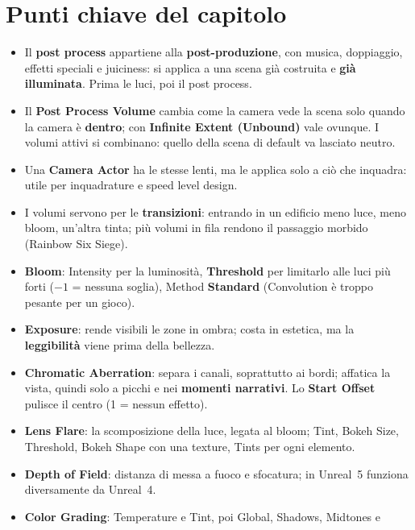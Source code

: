 \section*{Punti chiave del capitolo}

\begin{itemize}
  \item Il \textbf{post process} appartiene alla \textbf{post-produzione}, con musica,
        doppiaggio, effetti speciali e juiciness: si applica a una scena già costruita e
        \textbf{già illuminata}. Prima le luci, poi il post process.
  \item Il \textbf{Post Process Volume} cambia come la camera vede la scena solo quando la
        camera è \textbf{dentro}; con \textbf{Infinite Extent (Unbound)} vale ovunque. I
        volumi attivi si combinano: quello della scena di default va lasciato neutro.
  \item Una \textbf{Camera Actor} ha le stesse lenti, ma le applica solo a ciò che inquadra:
        utile per inquadrature e speed level design.
  \item I volumi servono per le \textbf{transizioni}: entrando in un edificio meno luce, meno
        bloom, un'altra tinta; più volumi in fila rendono il passaggio morbido (Rainbow Six
        Siege).
  \item \textbf{Bloom}: Intensity per la luminosità, \textbf{Threshold} per limitarlo alle
        luci più forti ($-1$ = nessuna soglia), Method \textbf{Standard} (Convolution è troppo
        pesante per un gioco).
  \item \textbf{Exposure}: rende visibili le zone in ombra; costa in estetica, ma la
        \textbf{leggibilità} viene prima della bellezza.
  \item \textbf{Chromatic Aberration}: separa i canali, soprattutto ai bordi; affatica la vista,
        quindi solo a picchi e nei \textbf{momenti narrativi}. Lo \textbf{Start Offset} pulisce
        il centro (1 = nessun effetto).
  \item \textbf{Lens Flare}: la scomposizione della luce, legata al bloom; Tint, Bokeh Size,
        Threshold, Bokeh Shape con una texture, Tints per ogni elemento.
  \item \textbf{Depth of Field}: distanza di messa a fuoco e sfocatura; in Unreal~5 funziona
        diversamente da Unreal~4.
  \item \textbf{Color Grading}: Temperature e Tint, poi Global, Shadows, Midtones e

\end{itemize}

